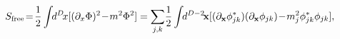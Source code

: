 \begin{equation}
 S_{\rm free}\!=\!\frac{1}{2}\int\!\! d^D\!x[(\partial_x\Phi)^2\!-\!m^2\Phi^2]
 =\sum_{j,k}\!\frac{1}{2}\int\!\!d^{D-2}\!{\bf x}[(\partial_{\bf x}\phi_{jk}^*)
 (\partial_{\bf x}\phi_{jk})\!-\!m_{j}^2\phi_{jk}^*\phi_{jk}],
\end{equation}

